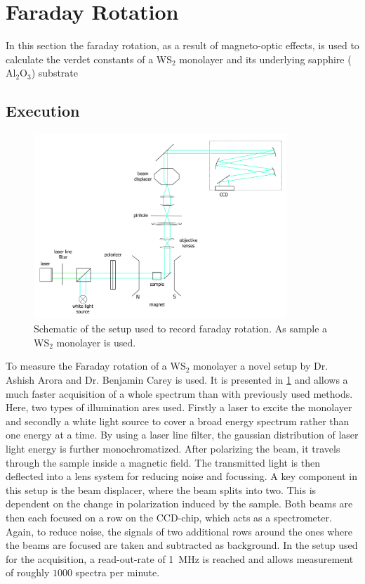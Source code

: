 \newpage
\section{Faraday Rotation}

In this section the faraday rotation, as a result of magneto-optic effects, is used to calculate the verdet constants of a WS$_2$ monolayer and its underlying sapphire ($\text{Al}_2\text{O}_3$) substrate

\subsection{Execution}

\begin{figure}[!ht]
    \centering
    \includegraphics[width=0.85\textwidth]{img/setup3.png}
    \caption{Schematic of the setup used to record faraday rotation. As sample a WS$_2$ monolayer is used.}
    \label{fig_setup3}
\end{figure}
To measure the Faraday rotation of a WS$_2$ monolayer a novel setup by Dr. Ashish Arora and Dr. Benjamin Carey is used.
It is presented in \cref{fig_setup3} and allows a much faster acquisition of a whole spectrum than with previously used methods.
Here, two types of illumination ares used.
Firstly a laser to excite the monolayer and secondly a white light source to cover a broad energy spectrum rather than one energy at a time.
By using a laser line filter, the gaussian distribution of laser light energy is further monochromatized.
After polarizing the beam, it travels through the sample inside a magnetic field.
The transmitted light is then deflected into a lens system for reducing noise and focussing.
A key component in this setup is the beam displacer, where the beam splits into two.
This is dependent on the change in polarization induced by the sample.
Both beams are then each focused on a row on the CCD-chip, which acts as a spectrometer.
Again, to reduce noise, the signals of two additional rows around the ones where the beams are focused are taken and subtracted as background.
In the setup used for the acquisition, a read-out-rate of \SI{1}{\mega\hertz} is reached and allows measurement of roughly $1000$ spectra per minute.

